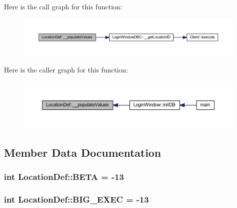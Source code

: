 Here is the call graph for this function\+:
\nopagebreak
\begin{figure}[H]
\begin{center}
\leavevmode
\includegraphics[width=350pt]{class_location_def_a9315c8e82c35f5879d9a1c7eac3e4bed_cgraph}
\end{center}
\end{figure}




Here is the caller graph for this function\+:
\nopagebreak
\begin{figure}[H]
\begin{center}
\leavevmode
\includegraphics[width=350pt]{class_location_def_a9315c8e82c35f5879d9a1c7eac3e4bed_icgraph}
\end{center}
\end{figure}




\subsection{Member Data Documentation}
\hypertarget{class_location_def_af4c40d736c3c509c5c89ca4a7c94ecef}{}
\subsubsection[{B\+E\+T\+A}]{\setlength{\rightskip}{0pt plus 5cm}int Location\+Def\+::\+B\+E\+T\+A = -\/13\hspace{0.3cm}{\ttfamily [static]}}\label{class_location_def_af4c40d736c3c509c5c89ca4a7c94ecef}
\hypertarget{class_location_def_a45b7e776465e77884602b8cfcd0d03fc}{}
\subsubsection[{B\+I\+G\+\_\+\+E\+X\+E\+C}]{\setlength{\rightskip}{0pt plus 5cm}int Location\+Def\+::\+B\+I\+G\+\_\+\+E\+X\+E\+C = -\/13\hspace{0.3cm}{\ttfamily [static]}}\label{class_location_def_a45b7e776465e77884602b8cfcd0d03fc}
\hypertarget{class_location_def_a707f0b4b5fa47109e1484118cac660be}{}
